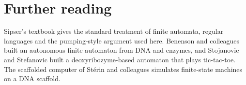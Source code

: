 \section*{Further reading}
Sipser's textbook gives the standard treatment of finite automata, regular
languages and the pumping-style argument used here.\cite{Sipser2013} Benenson
and colleagues built an autonomous finite automaton from DNA and
enzymes,\cite{Benenson2001} and Stojanovic and Stefanovic built a
deoxyribozyme-based automaton that plays tic-tac-toe.\cite{Stojanovic2003} The
scaffolded computer of St\'erin and colleagues simulates finite-state machines
on a DNA scaffold.\cite{Sterin2026}
